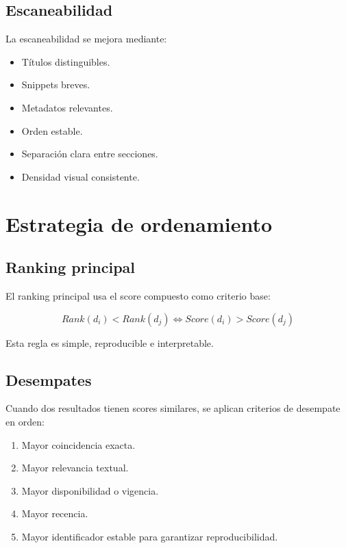 \documentclass[12pt,a4paper]{article}
\begin{document}
\subsection{Escaneabilidad}

La escaneabilidad se mejora mediante:

\begin{itemize}[noitemsep]
    \item Títulos distinguibles.
    \item Snippets breves.
    \item Metadatos relevantes.
    \item Orden estable.
    \item Separación clara entre secciones.
    \item Densidad visual consistente.
\end{itemize}

\section{Estrategia de ordenamiento}

\subsection{Ranking principal}

El ranking principal usa el score compuesto como criterio base:

\[
Rank(d_i) < Rank(d_j) \iff Score(d_i) > Score(d_j)
\]

Esta regla es simple, reproducible e interpretable.

\subsection{Desempates}

Cuando dos resultados tienen scores similares, se aplican criterios de desempate en orden:

\begin{enumerate}[noitemsep]
    \item Mayor coincidencia exacta.
    \item Mayor relevancia textual.
    \item Mayor disponibilidad o vigencia.
    \item Mayor recencia.
    \item Mayor identificador estable para garantizar reproducibilidad.
\end{enumerate}
\end{document}
